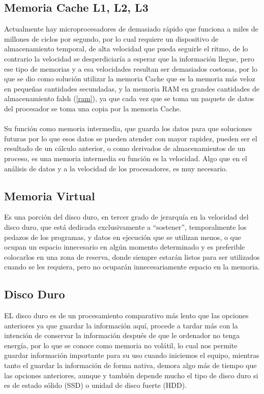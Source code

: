 \documentclass{article}
\begin{document}
	\subsection{Memoria Cache L1, L2, L3}
	Actualmente hay microprocesadores de demasiado rápido que funciona a miles de millones de  ciclos por segundo, por lo cual requiere un dispositivo de almacenamiento temporal, de alta velocidad que pueda seguirle el ritmo, de lo contrario la velocidad se desperdiciaría a esperar que la información llegue, pero ese tipo de memorias y a esa velocidades resultan ser demasiados costosas, por lo que se dio como solución utilizar la memoria Cache que es la memoria más veloz en pequeñas cantidades secundadas, y la memoria RAM en grandes cantidades de almacenamiento falsh (\ref{ram}), ya que cada vez que se toma un paquete de datos del procesador se toma una copia por la memoria Cache.\cite{cache}
	\\\\
	Su función como memoria intermedia, que guarda los datos para que soluciones futuras por lo que esos datos se pueden atender con mayor rapidez, pueden ser el resultado de un cálculo anterior,\cite{cache} o como derivados de almacenamientos de un proceso, es una memoria intermedia su función es la velocidad. Algo que en el análisis de datos y a la velocidad de los procesadores, es muy necesario.
	
	\subsection{Memoria Virtual}
	Es una porción del disco duro, en tercer grado de jerarquía en la velocidad del disco duro, que está dedicada exclusivamente a “sostener”, temporalmente los pedazos de los programas, y datos en ejecución que se utilizan menos, o que ocupan un espacio innecesario en algún momento determinado y es preferible colocarlos en una zona de reserva, donde siempre estarán listos para ser utilizados cuando se les requiera, pero no ocuparán innecesariamente espacio en la memoria.
	
	\subsection{Disco Duro}
	EL disco duro es de un procesamiento comparativo más lento que las opciones anteriores ya que guardar la información aquí, procede a tardar más con la intención de conservar la información después de que le ordenador no tenga energía, por lo que se conoce como memoria no volátil, lo cual nos permite guardar información importante para su uso cuando iniciemos el equipo, mientras tanto el guardar la información de forma nativa, demora algo más de tiempo que las opciones anteriores, aunque y también depende mucho el tipo de disco duro si es de estado sólido (SSD) o unidad de disco fuerte (HDD).
	
\end{document}
